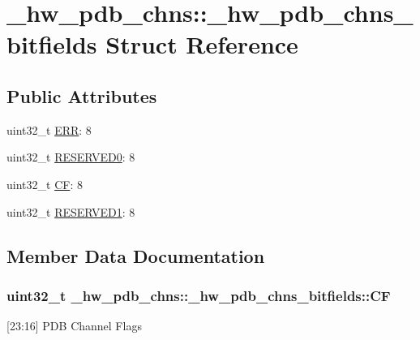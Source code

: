 \hypertarget{struct__hw__pdb__chns_1_1__hw__pdb__chns__bitfields}{}\section{\+\_\+hw\+\_\+pdb\+\_\+chns\+:\+:\+\_\+hw\+\_\+pdb\+\_\+chns\+\_\+bitfields Struct Reference}
\label{struct__hw__pdb__chns_1_1__hw__pdb__chns__bitfields}
\subsection*{Public Attributes}
\begin{DoxyCompactItemize}
\item 
uint32\+\_\+t \hyperlink{struct__hw__pdb__chns_1_1__hw__pdb__chns__bitfields_af58d63b81b15b1054b0d1ab4d6eebd6f}{E\+RR}\+: 8
\item 
uint32\+\_\+t \hyperlink{struct__hw__pdb__chns_1_1__hw__pdb__chns__bitfields_ab502d91b5c3f4de3b4ad9451afb6cdad}{R\+E\+S\+E\+R\+V\+E\+D0}\+: 8
\item 
uint32\+\_\+t \hyperlink{struct__hw__pdb__chns_1_1__hw__pdb__chns__bitfields_adf0065a48b2d48699c05f2e43f58ef2c}{CF}\+: 8
\item 
uint32\+\_\+t \hyperlink{struct__hw__pdb__chns_1_1__hw__pdb__chns__bitfields_af24e37c6931bdc4360eff858268e1a9c}{R\+E\+S\+E\+R\+V\+E\+D1}\+: 8
\end{DoxyCompactItemize}


\subsection{Member Data Documentation}
\subsubsection[{\texorpdfstring{CF}{CF}}]{\setlength{\rightskip}{0pt plus 5cm}uint32\+\_\+t \+\_\+hw\+\_\+pdb\+\_\+chns\+::\+\_\+hw\+\_\+pdb\+\_\+chns\+\_\+bitfields\+::\+CF}\hypertarget{struct__hw__pdb__chns_1_1__hw__pdb__chns__bitfields_adf0065a48b2d48699c05f2e43f58ef2c}{}\label{struct__hw__pdb__chns_1_1__hw__pdb__chns__bitfields_adf0065a48b2d48699c05f2e43f58ef2c}
\mbox{[}23\+:16\mbox{]} P\+DB Channel Flags 
